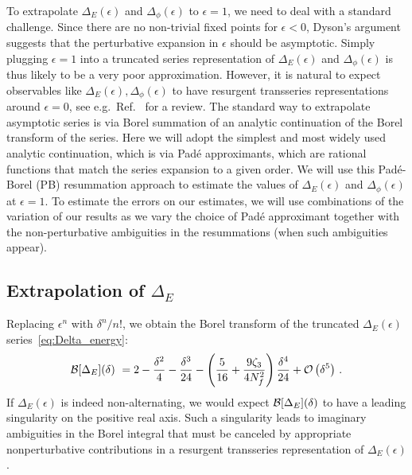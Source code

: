 \documentclass[
 reprint,







nofootinbib,


 amsmath,amssymb,
 aps,
 prd






tightenlines
]{revtex4-2}
\begin{document}
To extrapolate $\Delta_E(\epsilon)$ and $\Delta_{\phi}(\epsilon)$ to $\epsilon=1$, we need to deal with a standard challenge.
Since there are no non-trivial fixed points for $\epsilon<0$, Dyson's
argument~\cite{Dyson:1952tj} suggests that the perturbative expansion in $\epsilon$
should be asymptotic.  Simply plugging $\epsilon = 1$ into a truncated series representation of $\Delta_E(\epsilon)$ and $\Delta_{\phi}(\epsilon)$ is thus likely to be a very poor approximation.  However, it is natural to expect observables like
$\Delta_{E}(\epsilon), \Delta_{\phi}(\epsilon)$ to have resurgent transseries
representations around $\epsilon = 0$, see e.g.~Ref.~\cite{Aniceto:2018bis} for
a review.  The standard way to extrapolate asymptotic series is via Borel
summation of an analytic continuation of the Borel transform of the series. Here
we will adopt the
simplest and most widely used analytic continuation, which is via Pad\'e
approximants, which are rational functions that match the series expansion to a
given order.  We will use this Pad\'e-Borel (PB) resummation approach to estimate the values of $\Delta_E(\epsilon)$ and $\Delta_{\phi}(\epsilon)$ at $\epsilon=1$.  To estimate the errors on our estimates, we will use combinations of the variation of our results as we vary the choice of Pad\'e approximant together  with the non-perturbative ambiguities in the resummations (when such ambiguities appear).





\subsection[Extrapolation of Delta-energy]{Extrapolation of $\Delta_E$}
\label{sec:delta_energy}



Replacing $\epsilon^n$ with $\delta^n/n!$, we obtain the Borel transform of the truncated $\Delta_E(\epsilon)$ series~\eqref{eq:Delta_energy}:
\begin{align}\label{eq:Borel_energy}
    \mathcal{B}[\Delta_E](\delta)\ = 2-\frac{\delta^2}{4}
    - \frac{\delta^3}{24}
    - \left( \frac{5}{16} + \frac{9\zeta_3}{4N_f^2} \right)\frac{\delta^4}{24}
    +\mathcal{O}\left(\delta^5\right)\,.
\end{align}
If $\Delta_E(\epsilon)$ is indeed non-alternating, we would expect $\mathcal{B}[\Delta_E](\delta)$ to have a leading singularity on the positive real axis.
Such a singularity leads to imaginary ambiguities in the Borel integral that must be canceled by appropriate nonperturbative contributions in a resurgent transseries representation of $\Delta_E(\epsilon)$.
\end{document}
